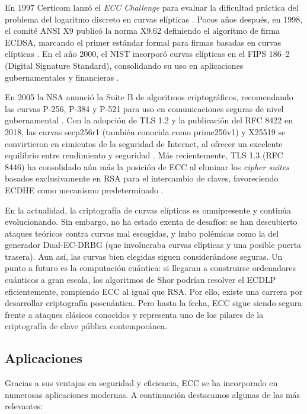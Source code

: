 En 1997 Certicom lanzó el \emph{ECC Challenge} para evaluar la dificultad práctica del problema del logaritmo discreto en curvas elípticas \cite{gaudry2007breaking}. Pocos años después, en 1998, el comité ANSI X9 publicó la norma X9.62 definiendo el algoritmo de firma ECDSA, marcando el primer estándar formal para firmas basadas en curvas elípticas \cite{ansi-x962}. En el año 2000, el NIST incorporó curvas elípticas en el FIPS 186--2 (Digital Signature Standard), consolidando su uso en aplicaciones gubernamentales y financieras \cite{nist-fips186-2}.

En 2005 la NSA anunció la Suite B de algoritmos criptográficos, recomendando las curvas P-256, P-384 y P-521 para uso en comunicaciones seguras de nivel gubernamental \cite{rfc5430}. Con la adopción de TLS 1.2 y la publicación del RFC 8422 en 2018, las curvas secp256r1 (también conocida como prime256v1) y X25519 se convirtieron en cimientos de la seguridad de Internet, al ofrecer un excelente equilibrio entre rendimiento y seguridad \cite{rfc8422}. Más recientemente, TLS 1.3 (RFC 8446) ha consolidado aún más la posición de ECC al eliminar los \textit{cipher suites} basados exclusivamente en RSA para el intercambio de claves, favoreciendo ECDHE como mecanismo predeterminado \cite{rfc8446}.

En la actualidad, la criptografía de curvas elípticas es omnipresente y continúa evolucionando. Sin embargo, no ha estado exenta de desafíos: se han descubierto ataques teóricos contra curvas mal escogidas, y hubo polémicas como la del generador Dual-EC-DRBG (que involucraba curvas elípticas y una posible puerta trasera). Aun así, las curvas bien elegidas siguen considerándose seguras. Un punto a futuro es la computación cuántica: si llegaran a construirse ordenadores cuánticos a gran escala, los algoritmos de Shor podrían resolver el ECDLP eficientemente, rompiendo ECC al igual que RSA. Por ello, existe una carrera por desarrollar criptografía poscuántica. Pero hasta la fecha, ECC sigue siendo segura frente a ataques clásicos conocidos y representa uno de los pilares de la criptografía de clave pública contemporánea.


\subsection{Aplicaciones}
\label{subsec:ecc-aplicaciones}

Gracias a sus ventajas en seguridad y eficiencia, ECC se ha incorporado en numerosas aplicaciones modernas. A continuación destacamos algunas de las más relevantes:

